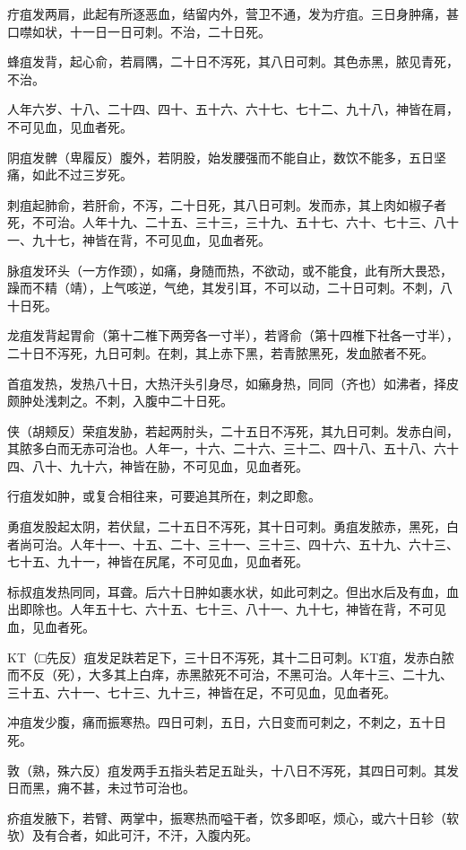 \documentclass[a4paper,12pt,UTF8,twoside]{ctexbook}
\begin{document}
疔疽发两肩，此起有所逐恶血，结留内外，营卫不通，发为疔疽。三日身肿痛，甚口噤如状，十一日一日可刺。不治，二十日死。

蜂疽发背，起心俞，若肩隅，二十日不泻死，其八日可刺。其色赤黑，脓见青死，不治。

人年六岁、十八、二十四、四十、五十六、六十七、七十二、九十八，神皆在肩，不可见血，见血者死。

阴疽发髀（卑履反）腹外，若阴股，始发腰强而不能自止，数饮不能多，五日坚痛，如此不过三岁死。

刺疽起肺俞，若肝俞，不泻，二十日死，其八日可刺。发而赤，其上肉如椒子者死，不可治。人年十九、二十五、三十三，三十九、五十七、六十、七十三、八十一、九十七，神皆在背，不可见血，见血者死。

脉疽发环头（一方作颈），如痛，身随而热，不欲动，或不能食，此有所大畏恐，躁而不精（靖），上气咳逆，气绝，其发引耳，不可以动，二十日可刺。不刺，八十日死。

龙疽发背起胃俞（第十二椎下两旁各一寸半），若肾俞（第十四椎下社各一寸半），二十日不泻死，九日可刺。在刺，其上赤下黑，若青脓黑死，发血脓者不死。

首疽发热，发热八十日，大热汗头引身尽，如癞身热，同同（齐也）如沸者，择皮颇肿处浅刺之。不刺，入腹中二十日死。

侠（胡颊反）荣疽发胁，若起两肘头，二十五日不泻死，其九日可刺。发赤白间，其脓多白而无赤可治也。人年一，十六、二十六、三十二、四十八、五十八、六十四、八十、九十六，神皆在胁，不可见血，见血者死。

行疽发如肿，或复合相往来，可要追其所在，刺之即愈。

勇疽发股起太阴，若伏鼠，二十五日不泻死，其十日可刺。勇疽发脓赤，黑死，白者尚可治。人年十一、十五、二十、三十一、三十三、四十六、五十九、六十三、七十五、九十一，神皆在尻尾，不可见血，见血者死。

标叔疽发热同同，耳聋。后六十日肿如裹水状，如此可刺之。但出水后及有血，血出即除也。人年五十七、六十五、七十三、八十一、九十七，神皆在背，不可见血，见血者死。

KT（□先反）疽发足趺若足下，三十日不泻死，其十二日可刺。KT疽，发赤白脓而不反（死），大多其上白痒，赤黑脓死不可治，不黑可治。人年十三、二十九、三十五、六十一、七十三、九十三，神皆在足，不可见血，见血者死。

冲疽发少腹，痛而振寒热。四日可刺，五日，六日变而可刺之，不刺之，五十日死。

敦（熟，殊六反）疽发两手五指头若足五趾头，十八日不泻死，其四日可刺。其发日而黑，痈不甚，未过节可治也。

疥疽发腋下，若臂、两掌中，振寒热而嗌干者，饮多即呕，烦心，或六十日轸（软欤）及有合者，如此可汗，不汗，入腹内死。
\end{document}
